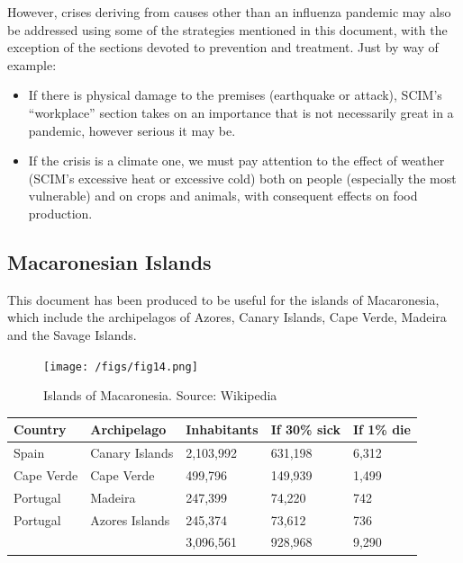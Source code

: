 \documentclass[12pt, a4]{scrartcl}
\begin{document}
However, crises deriving from causes other than an influenza pandemic may also be addressed using some of the strategies mentioned in this document, with the exception of the sections devoted to prevention and treatment. Just by way of example:
\begin{itemize}
	\item If there is physical damage to the premises (earthquake or attack), SCIM's “workplace” section takes on an importance that is not necessarily great in a pandemic, however serious it may be.
	\item If the crisis is a climate one, we must pay attention to the effect of weather (SCIM's excessive heat or excessive cold) both on people (especially the most vulnerable) and on crops and animals, with consequent effects on food production.
\end{itemize}

\subsection{Macaronesian Islands}
This document has been produced to be useful for the islands of Macaronesia, which include the archipelagos of Azores, Canary Islands, Cape Verde, Madeira and the Savage Islands.

\begin{figure}[h]
\centering
\texttt{[image: /figs/fig14.png]}
\caption{Islands of Macaronesia. Source: Wikipedia}
\end{figure}

\begin{center}
\begin{tabular}{ | m{3cm} | m{3cm} | m{3cm} | m{3cm} | m{3cm} |}
 \hline
\textbf{Country} & \textbf{Archipelago} & \textbf{Inhabitants} & \textbf{If 30\% sick} & \textbf{If 1\% die}\\
 \hline
Spain & Canary Islands & 2,103,992 & 631,198 & 6,312 \\
 \hline
Cape Verde & Cape Verde & 499,796 & 149,939 & 1,499 \\
 \hline
Portugal & Madeira & 247,399 & 74,220 & 742 \\
 \hline
Portugal & Azores Islands & 245,374 & 73,612 & 736 \\
 \hline
 & & 3,096,561 & 928,968 & 9,290 \\
 \hline
\end{tabular}
\end{center}
\end{document}
